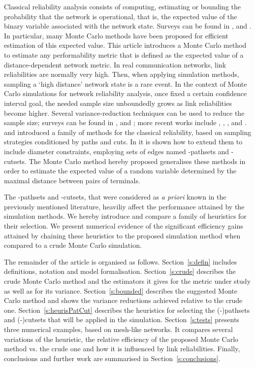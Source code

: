 \documentclass[a4paper]{article}
\begin{document}
Classical reliability analysis consists of computing, estimating or bounding the probability that the network is operational, that is, the expected value of the binary variable associated with the network state. Surveys can be found in \cite{Colbourn87}, \cite{Rub96} and \cite{Petingi2008}. In particular, many Monte Carlo methods have been proposed for efficient estimation of this expected value. This article introduces a Monte Carlo method to estimate any performability metric that is defined as the expected value of a distance-dependent network metric. In real communication networks, link reliabilities are normally very high. Then, when applying simulation methods, sampling a `high distance' network state is a rare event. In the context of Monte Carlo simulations for network reliability analysis, once fixed a certain confidence interval goal, the needed sample size unboundedly grows as link reliabilities become higher. Several variance-reduction techniques can be used to reduce the sample size; surveys can be found in \cite{rubino2009rare}, \cite{Can-ElKha-Rub-2009} and \cite{Gertsbakh2009}; more recent works include \cite{Can-LEcu-Lee-Rub-Tuf-2009}, \cite{Can-LEcu-Rub-Tuf-2010}, \cite{LEcu-Rub-Sag-Tuf-2011}, \cite{Zenklusen-Laumanns-2011} and \cite{Bot-LEcu-Rub-Sim-Tuf-2012}. \cite{KTI1977} and \cite{Fishman1986} introduced a family of methods for the classical reliability, based on sampling strategies conditioned by paths and cuts. In \cite{SartorCOMCOM2012} it is shown how to extend them to include diameter constraints, employing sets of edges named -pathsets and -cutsets. The Monte Carlo method hereby proposed generalises these methods in order to estimate the expected value of a random variable determined by the maximal distance between pairs of terminals.

The -pathsets and -cutsets, that were considered as \emph{a priori} known in the previously mentioned literature, heaviliy affect the performance attained by the simulation methods. We hereby introduce and compare a family of heuristics for their selection. We present numerical evidence of the significant efficiency gains attained by chaining these heuristics to the proposed simulation method when compared to a crude Monte Carlo simulation. 

The remainder of the article is organised as follows. Section~\ref{s:defin} includes definitions, notation and model formalisation. Section~\ref{s:crude} describes the crude Monte Carlo method and the estimators it gives for the metric under study as well as for its variance. Section~\ref{s:bounded} describes the suggested Monte Carlo method and shows the variance reductions achieved relative to the crude one. Section~\ref{s:heurisPatCut} describes the heuristics for selecting the (-)pathsets and (-)cutsets that will be applied in the simulation. Section~\ref{s:tests} presents three numerical examples, based on mesh-like networks. It compares several variations of the heuristic, the relative efficiency of the proposed Monte Carlo method vs. the crude one and how it is influenced by link reliabilities. Finally, conclusions and further work are summarised in Section~\ref{s:conclusions}.
\end{document}

